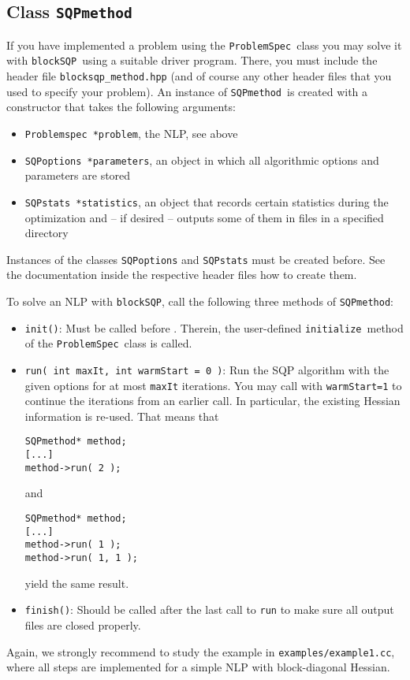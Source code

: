 \documentclass[	11pt,
				a4paper,
				abstract=true,
				twoside=true,
				bibliography=totoc, 
				headinclude=true,
				footinclude=false]{scrartcl}
\newcommand{\blockSQP}{\texttt{blockSQP}}
\newcommand{\method}{\texttt{SQPmethod}}
\newcommand{\problem}{\texttt{ProblemSpec}}
\newcommand{\init}{\texttt{initialize}}
\begin{document}
\subsection{Class \method}
If you have implemented a problem using the \problem\ class you may solve it with \blockSQP\ using a suitable driver program. There, you must include the header file \texttt{blocksqp\_method.hpp} (and of course any other header files that you used to specify your problem).
An instance of \method\ is created with a constructor that takes the following arguments:
\begin{itemize}
\item \texttt{Problemspec *problem}, the NLP, see above
\item \texttt{SQPoptions *parameters}, an object in which all algorithmic options and parameters are stored
\item \texttt{SQPstats *statistics}, an object that records certain statistics during the optimization and -- if desired -- outputs some of them in files in a specified directory
\end{itemize}
Instances of the classes \texttt{SQPoptions} and \texttt{SQPstats} must be created before. See the documentation inside the respective header files how to create them.

To solve an NLP with \blockSQP, call the following three methods of \method:
\begin{itemize}
\item \texttt{init()}: Must be called before . Therein, the user-defined \init\ method of the \problem\ class is called.
\item \texttt{run( int maxIt, int warmStart = 0 )}: Run the SQP algorithm with the given options for at most \texttt{maxIt} iterations. You may call with \texttt{warmStart=1} to continue the iterations from an earlier call. In particular, the existing Hessian information is re-used. That means that
\begin{lstlisting}
SQPmethod* method;
[...]
method->run( 2 );
\end{lstlisting}
and
\begin{lstlisting}
SQPmethod* method;
[...]
method->run( 1 );
method->run( 1, 1 );
\end{lstlisting}
yield the same result.
\item \texttt{finish()}: Should be called after the last call to \texttt{run} to make sure all output files are closed properly.
\end{itemize}
Again, we strongly recommend to study the example in \texttt{examples/example1.cc}, where all steps are implemented for a simple NLP with block-diagonal Hessian.
\end{document}

